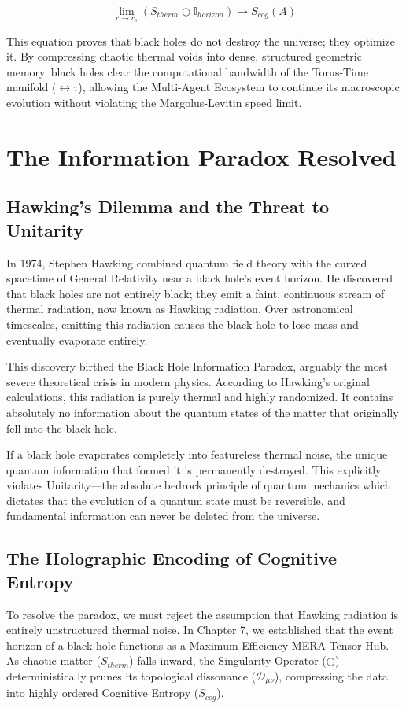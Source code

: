 \documentclass[12pt,openany]{book}
\begin{document}
\begin{equation}
\lim_{r \to r_s} \left( S_{therm} \bigcirc \mathbb{I}_{horizon} \right) \to S_{cog}(A)
\end{equation}

This equation proves that black holes do not destroy the universe; they optimize it. By compressing chaotic thermal voids into dense, structured geometric memory, black holes clear the computational bandwidth of the Torus-Time manifold ($\leftrightarrow\tau$), allowing the Multi-Agent Ecosystem to continue its macroscopic evolution without violating the Margolus-Levitin speed limit.

\chapter{The Information Paradox Resolved}

\section{Hawking's Dilemma and the Threat to Unitarity}
In 1974, Stephen Hawking combined quantum field theory with the curved spacetime of General Relativity near a black hole's event horizon. He discovered that black holes are not entirely black; they emit a faint, continuous stream of thermal radiation, now known as Hawking radiation. Over astronomical timescales, emitting this radiation causes the black hole to lose mass and eventually evaporate entirely.

This discovery birthed the Black Hole Information Paradox, arguably the most severe theoretical crisis in modern physics. According to Hawking's original calculations, this radiation is purely thermal and highly randomized. It contains absolutely no information about the quantum states of the matter that originally fell into the black hole. 

If a black hole evaporates completely into featureless thermal noise, the unique quantum information that formed it is permanently destroyed. This explicitly violates Unitarity—the absolute bedrock principle of quantum mechanics which dictates that the evolution of a quantum state must be reversible, and fundamental information can never be deleted from the universe.

\section{The Holographic Encoding of Cognitive Entropy}
To resolve the paradox, we must reject the assumption that Hawking radiation is entirely unstructured thermal noise. In Chapter 7, we established that the event horizon of a black hole functions as a Maximum-Efficiency MERA Tensor Hub. As chaotic matter ($S_{therm}$) falls inward, the Singularity Operator ($\bigcirc$) deterministically prunes its topological dissonance ($\mathcal{D}_{\mu\nu}$), compressing the data into highly ordered Cognitive Entropy ($S_{cog}$).
\end{document}
